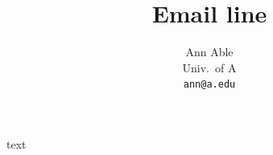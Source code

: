 \documentclass{article}
\newcommand{\email}[1]{\texttt{#1}}
\begin{document}
\title{Email line}
\author{Ann Able \\ Univ.\ of A \\ \email{ann@a.edu}}
\date{}
\maketitle
text
\end{document}
